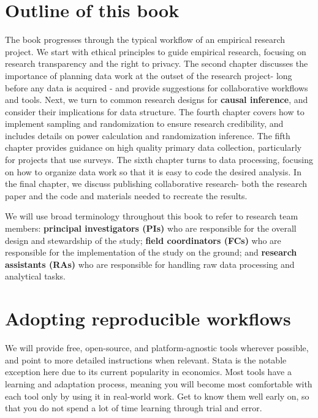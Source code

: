 \section{Outline of this book}
The book progresses through the typical workflow of an empirical research project.
We start with ethical principles to guide empirical research, 
focusing on research transparency and the right to privacy. 
The second chapter discusses the importance of planning data work at the outset of the research project- 
long before any data is acquired - and provide suggestions for collaborative workflows and tools. 
Next, we turn to common research designs for \textbf{causal inference}{}, and consider their implications for data structure. 
The fourth chapter covers how to implement sampling and randomization to ensure research credibility, 
and includes details on power calculation and randomization inference. 
The fifth chapter provides guidance on high quality primary data collection, particularly for projects that use surveys. 
The sixth chapter turns to data processing, 
focusing on how to organize data work so that it is easy to code the desired analysis. 
In the final chapter, we discuss publishing collaborative research- 
both the research paper and the code and materials needed to recreate the results.  

We will use broad terminology throughout this book to refer to research team members:
\textbf{principal investigators (PIs)} who are responsible for
the overall design and stewardship of the study;
\textbf{field coordinators (FCs)} who are responsible for
the implementation of the study on the ground;
and \textbf{research assistants (RAs)} who are responsible for
handling raw data processing and analytical tasks.


\section{Adopting reproducible workflows}
We will provide free, open-source, and platform-agnostic tools wherever possible,
and point to more detailed instructions when relevant.
Stata is the notable exception here due to its current popularity in economics.
Most tools have a learning and adaptation process,
meaning you will become most comfortable with each tool
only by using it in real-world work.
Get to know them well early on,
so that you do not spend a lot of time learning through trial and error.


